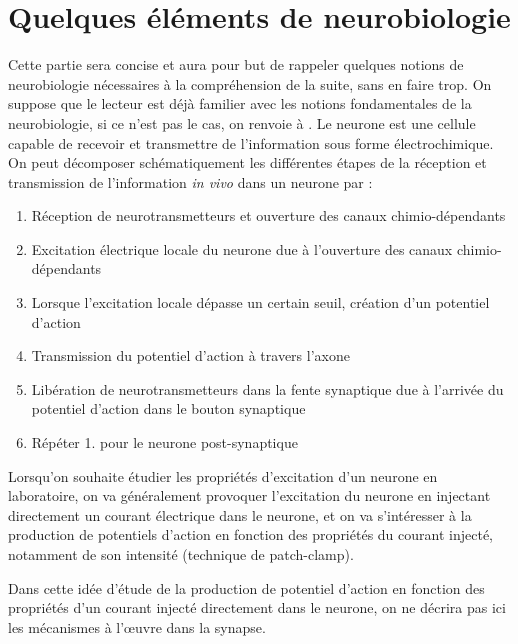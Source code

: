 \documentclass[12pt]{scrartcl}
\begin{document}
\section{Quelques éléments de neurobiologie} \label{rappelneuro1}
Cette partie sera concise et aura pour but de rappeler quelques notions de neurobiologie nécessaires à la compréhension de la suite, sans en faire trop. On suppose que le lecteur est déjà familier avec les notions fondamentales de la neurobiologie, si ce n'est pas le cas, on renvoie à \cite{kandel2000principles}. 
Le neurone est une cellule capable de recevoir et transmettre de l'information sous forme électrochimique. On peut décomposer schématiquement les différentes étapes de la réception et transmission de l'information \textit{in vivo} dans un neurone par :
\begin{enumerate}
\item Réception de neurotransmetteurs et ouverture des canaux chimio-dépendants
\item Excitation électrique locale du neurone due à l'ouverture des canaux chimio-dépendants
\item Lorsque l'excitation locale dépasse un certain seuil, création d'un potentiel d'action
\item Transmission du potentiel d'action à travers l'axone
\item Libération de neurotransmetteurs dans la fente synaptique due à l'arrivée du potentiel d'action dans le bouton synaptique 
\item Répéter 1. pour le neurone post-synaptique
\end{enumerate}

Lorsqu'on souhaite étudier les propriétés d'excitation d'un neurone en laboratoire, on va généralement provoquer l'excitation du neurone en injectant directement un courant électrique dans le neurone, et on va s'intéresser à la production de potentiels d'action en fonction des propriétés du courant injecté, notamment de son intensité (technique de patch-clamp). 

Dans cette idée d'étude de la production de potentiel d'action en fonction des propriétés d'un courant injecté directement dans le neurone, on ne décrira pas ici les mécanismes à l'œuvre dans la synapse.
\end{document}
